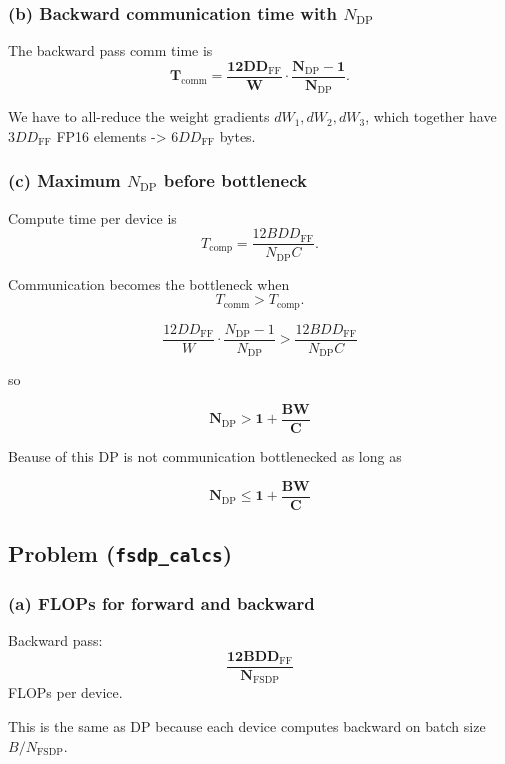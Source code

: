\documentclass[11pt]{article}
\begin{document}
\subsubsection*{(b) Backward communication time with $N_{\text{DP}}$}

The backward pass comm time is
\[
\mathbf{
T_{\mathrm{comm}}
=
\frac{12 D D_{\mathrm{FF}}}{W}
\cdot
\frac{N_{\mathrm{DP}} - 1}{N_{\mathrm{DP}}}
}.
\]

We have to all-reduce the weight gradients
\(dW_1, dW_2, dW_3\), which together have
\(3 D D_{\mathrm{FF}}\) FP16 elements -> \(6 D D_{\mathrm{FF}}\) bytes.


\vspace{4em}

\subsubsection*{(c) Maximum $N_{\text{DP}}$ before bottleneck}

Compute time per device is
\[
T_{\mathrm{comp}}
=
\frac{12 B D D_{\mathrm{FF}}}{N_{\mathrm{DP}} C}.
\]

Communication becomes the bottleneck when
\[
T_{\mathrm{comm}} > T_{\mathrm{comp}}.
\]

\[
\frac{12 D D_{\mathrm{FF}}}{W}
\cdot
\frac{N_{\mathrm{DP}} - 1}{N_{\mathrm{DP}}}
>
\frac{12 B D D_{\mathrm{FF}}}{N_{\mathrm{DP}} C}
\]

so

\[
\mathbf{
N_{\mathrm{DP}} > 1 + \frac{B W}{C}
}
\]

Beause of this DP is not communication bottlenecked as long as

\[
\mathbf{
N_{\mathrm{DP}} \le 1 + \frac{B W}{C}
}
\]

\vspace{4em}


\subsection{Problem (\texttt{fsdp\_calcs})}

\subsubsection*{(a) FLOPs for forward and backward}

Backward pass:
\[
\mathbf{
\frac{12 B D D_{\mathrm{FF}}}{N_{\mathrm{FSDP}}}
}
\]
FLOPs per device.

This is the same as DP because each device computes backward on batch size
\(B/N_{\mathrm{FSDP}}\).
\end{document}
